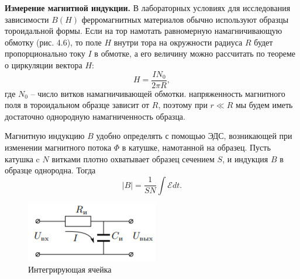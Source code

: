 \documentclass[12pt,a4paper]{article}
\begin{document}
\textbf{Измерение магнитной индукции.} 
В лабораторных условиях для исследования зависимости $B(H)$ ферромагнитных материалов обычно используют образцы тороидальной формы. Если на тор намотать равномерную намагничивающую обмотку (рис. 4.6), то поле $H$ внутри тора на окружности радиуса $R$ будет пропорционально току $I$ в обмотке, а его величину можно рассчитать по теореме о циркуляции вектора $H$:
\begin{equation}
H=\dfrac{IN_{0}}{2\pi R},
\label{equation_for_alena}
\end{equation}
где $N_0$ -- число витков намагничивающей обмотки. напряженность магнитного поля в тороидальном образце зависит от $R$, поэтому при $r \ll R$ мы будем иметь достаточно однородную намагниченность образца.

Магнитную индукцию $ B $ удобно
определять с помощью ЭДС, возникающей при изменении магнитного
потока $ \Phi $ в катушке, намотанной на образец. Пусть катушка c $ N $ витками плотно охватывает образец сечением $ S $, и индукция $ B $ в образце
однородна. Тогда
\begin{equation}
|B|=\frac{1}{SN}\int\mathcal{E} dt.
\label{eq:|B|}
\end{equation}
\begin{figure}
	\includegraphics[width=\linewidth]{int.png}
	\caption{Интегрирующая ячейка}
	\label{fig:int}
\end{figure}
\end{document}
